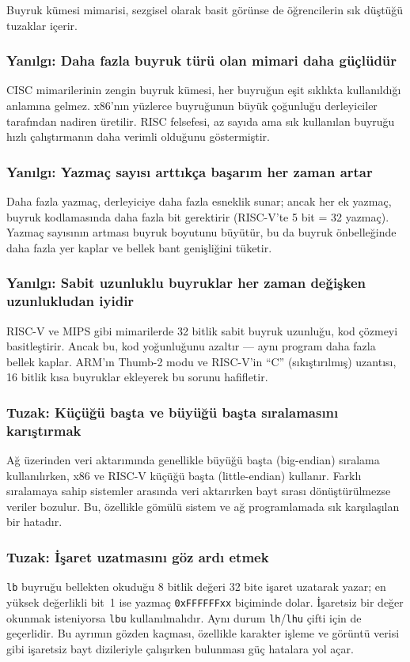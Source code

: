 Buyruk kümesi mimarisi, sezgisel olarak basit görünse de öğrencilerin sık düştüğü tuzaklar içerir.

\subsubsection*{Yanılgı: Daha fazla buyruk türü olan mimari daha güçlüdür}
CISC mimarilerinin zengin buyruk kümesi, her buyruğun eşit sıklıkta kullanıldığı anlamına gelmez. x86'nın yüzlerce buyruğunun büyük çoğunluğu derleyiciler tarafından nadiren üretilir. RISC felsefesi, az sayıda ama sık kullanılan buyruğu hızlı çalıştırmanın daha verimli olduğunu göstermiştir.

\subsubsection*{Yanılgı: Yazmaç sayısı arttıkça başarım her zaman artar}
Daha fazla yazmaç, derleyiciye daha fazla esneklik sunar; ancak her ek yazmaç, buyruk kodlamasında daha fazla bit gerektirir (RISC-V'te 5 bit = 32 yazmaç). Yazmaç sayısının artması buyruk boyutunu büyütür, bu da buyruk önbelleğinde daha fazla yer kaplar ve bellek bant genişliğini tüketir.

\subsubsection*{Yanılgı: Sabit uzunluklu buyruklar her zaman değişken uzunlukludan iyidir}
RISC-V ve MIPS gibi mimarilerde 32 bitlik sabit buyruk uzunluğu, kod çözmeyi basitleştirir. Ancak bu, kod yoğunluğunu azaltır --- aynı program daha fazla bellek kaplar. ARM'ın Thumb-2 modu ve RISC-V'in ``C'' (sıkıştırılmış) uzantısı, 16 bitlik kısa buyruklar ekleyerek bu sorunu hafifletir.

\subsubsection*{Tuzak: Küçüğü başta ve büyüğü başta sıralamasını karıştırmak}
Ağ üzerinden veri aktarımında genellikle büyüğü başta (big-endian) sıralama kullanılırken, x86 ve RISC-V küçüğü başta (little-endian) kullanır. Farklı sıralamaya sahip sistemler arasında veri aktarırken bayt sırası dönüştürülmezse veriler bozulur. Bu, özellikle gömülü sistem ve ağ programlamada sık karşılaşılan bir hatadır.

\subsubsection*{Tuzak: İşaret uzatmasını göz ardı etmek}
\texttt{lb} buyruğu bellekten okuduğu 8 bitlik değeri 32 bite işaret uzatarak yazar; en yüksek değerlikli bit~1 ise yazmaç \texttt{0xFFFFFFxx} biçiminde dolar. İşaretsiz bir değer okunmak isteniyorsa \texttt{lbu} kullanılmalıdır. Aynı durum \texttt{lh}/\texttt{lhu} çifti için de geçerlidir. Bu ayrımın gözden kaçması, özellikle karakter işleme ve görüntü verisi gibi işaretsiz bayt dizileriyle çalışırken bulunması güç hatalara yol açar.

